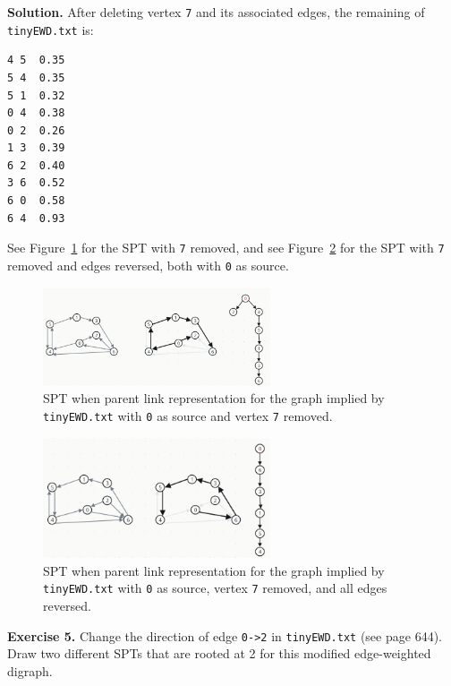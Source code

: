 \documentclass[12pt, a4paper]{article}
\newenvironment{ex}[2][Exercise]
{\par\medskip\noindent \textbf{#1 #2.}}
{\medskip}
\newenvironment{sol}[1][Solution]
{\par\medskip\noindent \textbf{#1.} }
{\medskip}
\begin{document}
	\begin{sol}
		After deleting vertex \texttt{7} and its associated edges, the remaining of
		\texttt{tinyEWD.txt} is:
		\begin{lstlisting}[language={}]
4 5  0.35
5 4  0.35
5 1  0.32
0 4  0.38
0 2  0.26
1 3  0.39
6 2  0.40
3 6  0.52
6 0  0.58
6 4  0.93
		\end{lstlisting}
		See Figure~\ref{fig:ex-04-a} for the SPT with \texttt{7} removed, and see
		Figure~\ref{fig:ex-04-b} for the SPT with \texttt{7} removed and edges reversed,
		both with \texttt{0} as source.
		\begin{figure}
			\centering
			\includegraphics[width=0.6\textwidth]{exercise-04-a}
			\caption{SPT when parent link representation for the graph implied by
				\texttt{tinyEWD.txt} with \texttt{0} as source and vertex \texttt{7} removed.}
			\label{fig:ex-04-a}
		\end{figure}
		\begin{figure}
			\centering
			\includegraphics[width=0.6\textwidth]{exercise-04-b}
			\caption{SPT when parent link representation for the graph implied by
			\texttt{tinyEWD.txt} with \texttt{0} as source, vertex \texttt{7} removed,
			and all edges reversed.}
			\label{fig:ex-04-b}
		\end{figure}
	\end{sol}
	\begin{ex}{5}
		Change the direction of edge \texttt{0->2} in \texttt{tinyEWD.txt} (see page 644).
		Draw two different SPTs that are rooted at 2 for this modified edge-weighted
		digraph.
	\end{ex}
\end{document}

